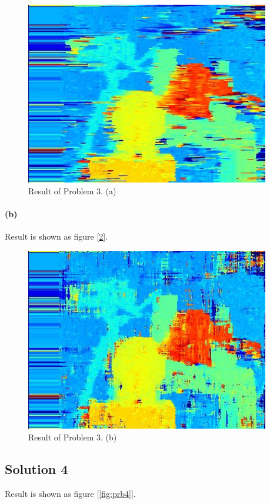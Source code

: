 \documentclass{article}
\newcommand{\solution}[1]{\clearpage \subsection*{Solution #1}}
\newcommand{\spart}[1]{\paragraph{(#1)}}
\begin{document}
\begin{figure}[!h]
  \centering
  \includegraphics[height=8cm]{code/outputs/prob3a.jpg}
  \caption{Result of Problem 3. (a)}
  \label{fig:prb3a}
\end{figure}

\spart{b} Result is shown as figure [\ref{fig:prb3b}].

\begin{figure}[!h]
  \centering
  \includegraphics[height=8cm]{code/outputs/prob3b.jpg}
  \caption{Result of Problem 3. (b)}
  \label{fig:prb3b}
\end{figure}

\solution{4} 

Result is shown as figure [\ref{fig:prb4}].
\end{document}
